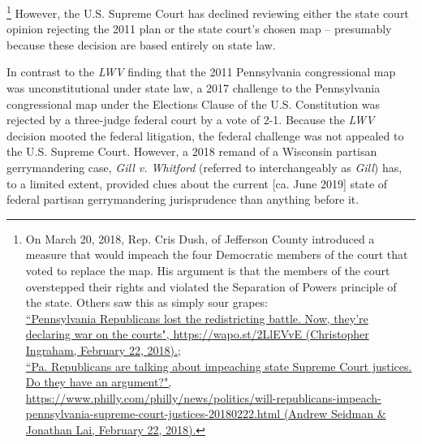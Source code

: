         \footnote{On March 20, 2018, Rep. Cris Dush, of Jefferson County introduced a measure that would impeach the four Democratic members of the court that voted to replace the map. His argument is that the members of the court overstepped their rights and violated the Separation of Powers principle of the state. Others saw this as simply sour grapes: \\ \href{https://wapo.st/2LlEVvE}{``Pennsylvania Republicans lost the redistricting battle. Now, they’re declaring war on the courts", https://wapo.st/2LlEVvE (Christopher Ingraham, February 22, 2018).;} \\ \href{https://www.philly.com/philly/news/politics/will-republicans-impeach-pennsylvania-supreme-court-justices-20180222.html}{``Pa. Republicans are talking about impeaching state Supreme Court justices. Do they have an argument?", https://www.philly.com/philly/news/politics/will-republicans-impeach-pennsylvania-supreme-court-justices-20180222.html (Andrew Seidman \& Jonathan Lai, February 22, 2018).}}
    However, the U.S. Supreme Court has declined reviewing either the state court opinion rejecting the 2011 plan or the state court’s chosen map -- presumably because these decision are based entirely on state law.
\par
    In contrast to the \textit{LWV} finding that the 2011 Pennsylvania congressional map was unconstitutional under state law, a 2017 challenge to the Pennsylvania congressional map under the Elections Clause of the U.S. Constitution was rejected by a three-judge federal court by a vote of 2-1. Because the \textit{LWV} decision mooted the federal litigation, the federal challenge was not appealed to the U.S. Supreme Court. However, a 2018 remand of a Wisconsin partisan gerrymandering case, \textit{Gill v. Whitford} (referred to interchangeably as \textit{Gill}) has, to a limited extent, provided clues about the current [ca. June 2019] state of federal partisan gerrymandering jurisprudence than anything before it.
